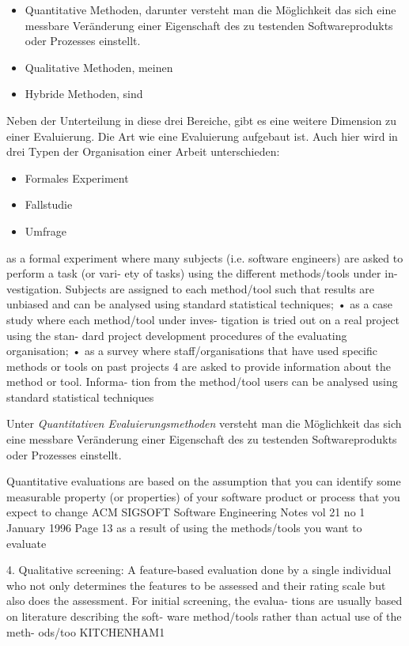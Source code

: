 \documentclass[draft=false
              ,paper=a4
              ,twoside=false
              ,fontsize=11pt
              ,headsepline
              ,BCOR10mm
              ,DIV11
              ]{scrbook}
\begin{document}
\begin{itemize}
  \item Quantitative Methoden, darunter versteht man die Möglichkeit das sich eine messbare Veränderung einer Eigenschaft des zu testenden Softwareprodukts oder Prozesses einstellt.
  \item Qualitative Methoden, meinen
  \item Hybride Methoden, sind
\end{itemize}

Neben der Unterteilung in diese drei Bereiche, gibt es eine weitere Dimension zu einer Evaluierung. Die Art wie eine Evaluierung aufgebaut ist. Auch hier wird in drei Typen der Organisation einer Arbeit unterschieden:

\begin{itemize}
  \item Formales Experiment
  \item Fallstudie
  \item Umfrage
\end{itemize}

as  a  formal  experiment  where  many  subjects  (i.e.  software  engineers)  are  asked  to  perform  a  task  (or  vari-  ety  of  tasks)  using  the  different  methods/tools  under  in-  vestigation.  Subjects  are  assigned  to  each  method/tool  such  that  results  are  unbiased  and  can  be  analysed  using  standard  statistical  techniques;  •  as  a  case  study  where  each  method/tool  under  inves-  tigation  is  tried  out  on  a  real  project  using  the  stan-  dard  project  development  procedures  of  the  evaluating  organisation;  •  as  a  survey  where  staff/organisations  that  have  used  specific  methods  or  tools  on  past  projects  4  are  asked  to  provide  information  about  the  method  or  tool.  Informa-  tion  from  the  method/tool  users  can  be  analysed  using  standard  statistical  techniques

Unter \textit{Quantitativen Evaluierungsmethoden} versteht man die Möglichkeit das sich eine messbare Veränderung einer Eigenschaft des zu testenden Softwareprodukts oder Prozesses einstellt. 

Quantitative evaluations are based on the assumption that
you can identify some measurable property (or properties) of
your software product or process that you expect to change
ACM SIGSOFT  Software Engineering Notes vol 21 no 1
January 1996 Page 13
as a result of using the methods/tools you want to evaluate

4. Qualitative screening: A feature-based evaluation done by a  single individual who not only determines the features to be assessed and their rating scale but also does the assessment. For  initial screening, the evalua- tions are usually based  on literature describing the soft- ware method/tools rather than actual use of the meth- ods/too KITCHENHAM1
\end{document}
